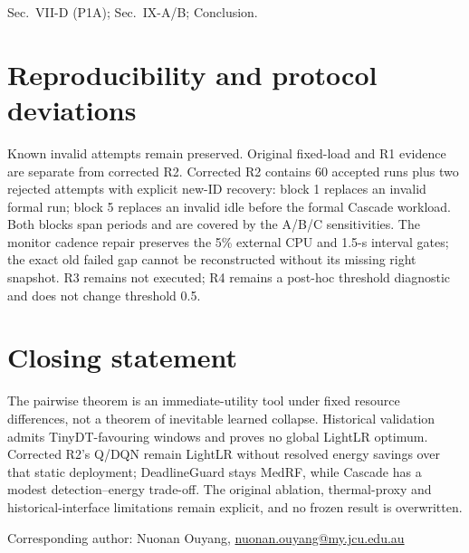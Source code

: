 \documentclass[10pt,a4paper]{article}
\begin{document}
\begin{wherebox}
Sec.~VII-D (P1A); Sec.~IX-A/B; Conclusion.
\end{wherebox}

\section*{Reproducibility and protocol deviations}
Known invalid attempts remain preserved. Original fixed-load and R1 evidence are separate from corrected R2. Corrected R2 contains 60 accepted runs plus two rejected attempts with explicit new-ID recovery: block 1 replaces an invalid formal run; block 5 replaces an invalid idle before the formal Cascade workload. Both blocks span periods and are covered by the A/B/C sensitivities. The monitor cadence repair preserves the 5\% external CPU and 1.5-s interval gates; the exact old failed gap cannot be reconstructed without its missing right snapshot. R3 remains not executed; R4 remains a post-hoc threshold diagnostic and does not change threshold 0.5.

\section*{Closing statement}
\begin{authorresponsebox}
The pairwise theorem is an immediate-utility tool under fixed resource differences, not a theorem of inevitable learned collapse. Historical validation admits TinyDT-favouring windows and proves no global LightLR optimum. Corrected R2's Q/DQN remain LightLR without resolved energy savings over that static deployment; DeadlineGuard stays MedRF, while Cascade has a modest detection--energy trade-off. The original ablation, thermal-proxy and historical-interface limitations remain explicit, and no frozen result is overwritten.
\end{authorresponsebox}

\vspace{6pt}
Corresponding author: Nuonan Ouyang, \href{mailto:nuonan.ouyang@my.jcu.edu.au}{nuonan.ouyang@my.jcu.edu.au}
\end{document}
